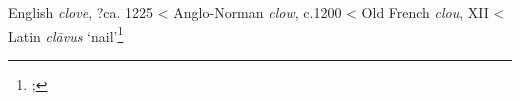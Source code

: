 \begin{etymology}\label{ety:clove}
English \textit{clove}, ?ca. 1225
< Anglo-Norman \textit{clow}, c.1200
< Old French \textit{clou}, XII
< Latin \textit{clāvus} `nail'\footnote{; }
\end{etymology}